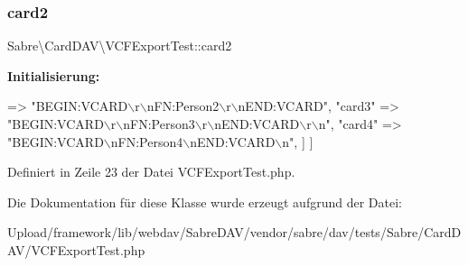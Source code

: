 \subsubsection{\texorpdfstring{card2}{card2}}
{\footnotesize\ttfamily Sabre\textbackslash{}\+Card\+D\+A\+V\textbackslash{}\+V\+C\+F\+Export\+Test\+::card2}

{\bfseries Initialisierung\+:}
\begin{DoxyCode}
=> \textcolor{stringliteral}{"BEGIN:VCARD\(\backslash\)r\(\backslash\)nFN:Person2\(\backslash\)r\(\backslash\)nEND:VCARD"},
            \textcolor{stringliteral}{"card3"} => \textcolor{stringliteral}{"BEGIN:VCARD\(\backslash\)r\(\backslash\)nFN:Person3\(\backslash\)r\(\backslash\)nEND:VCARD\(\backslash\)r\(\backslash\)n"},
            \textcolor{stringliteral}{"card4"} => \textcolor{stringliteral}{"BEGIN:VCARD\(\backslash\)nFN:Person4\(\backslash\)nEND:VCARD\(\backslash\)n"},
        ]
    ]
\end{DoxyCode}


Definiert in Zeile 23 der Datei V\+C\+F\+Export\+Test.\+php.



Die Dokumentation für diese Klasse wurde erzeugt aufgrund der Datei\+:\begin{DoxyCompactItemize}
\item 
Upload/framework/lib/webdav/\+Sabre\+D\+A\+V/vendor/sabre/dav/tests/\+Sabre/\+Card\+D\+A\+V/V\+C\+F\+Export\+Test.\+php\end{DoxyCompactItemize}
